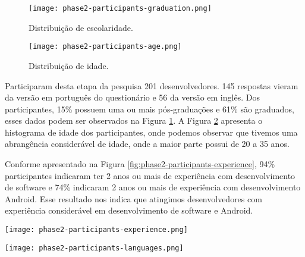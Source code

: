 \begin{figure*}[!b]
\centering
\begin{subfigure}{.62\textwidth}
  \centering
  \texttt{[image: phase2-participants-graduation.png]}
  \caption{Distribuição de escolaridade.}
  \label{fig:phase2-participants-graduation}
\end{subfigure}
\begin{subfigure}{.36\textwidth}
  \centering
  \texttt{[image: phase2-participants-age.png]}
  \caption{Distribuição de idade.}
  \label{fig:phase2-participants-age}
\end{subfigure}%
\caption{Escolaridade e distribuição de idade dos participantes em S$_2$.}
\label{fig:phase2-participants-graduation-age}
\vspace{-.5cm} 
\end{figure*}

Participaram desta etapa da pesquisa 201 desenvolvedores. 145 respostas vieram da versão em português do questionário e 56 da versão em inglês. Dos participantes, 15\% possuem uma ou mais pós-graduações e 61\% são graduados, esses dados podem ser observados na Figura \ref{fig:phase2-participants-graduation}. A Figura \ref{fig:phase2-participants-age} apresenta o histograma de idade dos participantes, onde podemos observar que tivemos uma abrangência considerável de idade, onde a maior parte possui de 20 a 35 anos.  


Conforme apresentado na Figura \ref{fig:phase2-participants-experience}, 94\% participantes indicaram ter 2 anos ou mais de experiência com desenvolvimento de software e 74\% indicaram 2 anos ou mais de experiência com desenvolvimento Android. Esse resultado nos indica que atingimos desenvolvedores com experiência considerável em desenvolvimento de software e Android. 

\begin{figure*}[!t]
\centering
\texttt{[image: phase2-participants-experience.png]}
\caption{Tempo de experiência com desenvolvimento de software e desenvolvimento Android dos participantes de S$_2$.}
\label{fig:phase2-participants-experience}
\end{figure*}

\begin{figure*}[!b]
  \centering
  \vspace{-.5cm} 
  \texttt{[image: phase2-participants-languages.png]}
  \caption{Nível de conhecimento em diversas linguagens de programação orientada a objetos dos participantes de S$_2$.}
  \label{fig:phase2-participants-languages}
  \vspace{-.5cm} 
\end{figure*}

